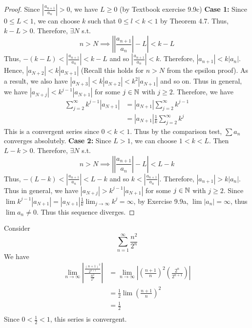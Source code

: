 \documentclass{article}
\begin{document}
\begin{proof}
Since $\left|\frac{a_{n+1}}{a_n}\right| > 0$, we have $L \geq 0$ (by Textbook exercise 9.9c)
\newline
\textbf{Case 1:}\newline
Since $0 \leq L < 1$,  we can choose $k$ such that $0 \leq l < k < 1$ by Theorem 4.7. Thus, $k-L >0$. Therefore, $\exists N$ s.t. \[n > N \implies \left| |\frac{a_{n+1}}{a_n}| - L \right| < k - L\]
Thus, $-(k-L) < \left| \frac{a_{n+1}}{a_n}\right| < k - L $ and so $\left| \frac{a_{n+1}}{a_n}\right| < k$. Therefore, $|a_{n+1}| < k|a_n|$. Hence, $|a_{N+2}| < k|a_{N+1}|$ (Recall this holds for $n > N$ from the epsilon proof). \newline As a result, we also have $|a_{N+3}| < k|a_{N+2}| < k^2|a_{N+1}|$ and so on. Thus in general, we have $|a_{N+j}| < k^{j-1}|a_{N+1}|$ for some $j \in \mathbb{N}$ with $j \geq 2$. Therefore, we have 
\begin{align*}
    \sum_{j=2}^\infty k^{j-1}|a_{N+1}| &= |a_{N+1}| \sum_{j=2}^\infty k^{j-1}\\
    &= |a_{N+1}|\frac{1}{k} \sum_{j=2}^\infty k^j
\end{align*}
This is a convergent series since $0 < k < 1$.
Thus by the comparison test, $\sum a_n$ converges absolutely.
\newline
\textbf{Case 2:}\newline
Since $L > 1$, we can choose $1 < k < L$. Then $L - k > 0$.
Therefore, $\exists N$ s.t. \[n > N \implies \left| |\frac{a_{n+1}}{a_n}| - L \right| < L-k\]
Thus, $-(L-k) < \left| \frac{a_{n+1}}{a_n}\right| < L-k $ and so $k < \left| \frac{a_{n+1}}{a_n}\right|$. Therefore, $|a_{n+1}| > k|a_n|$. Thus in general, we have $|a_{N+j}| > k^{j-1}|a_{N+1}|$ for some $j \in \mathbb{N}$ with $j \geq 2$.
Since $\lim k^{j-1}|a_{N+1}| = |a_{N+1}| \frac{1}{k} \lim_{j\to\infty} k^j = \infty$, by Exercise 9.9a, $\lim |a_n| = \infty$, thus $\lim a_n \not = 0$. Thus this sequence diverges.
\end{proof}
\begin{example}
Consider \[\sum_{n=1}^\infty \frac{n^2}{2^n}\]
We have
\begin{align*}
    \lim_{n\to\infty} \left|\frac{\frac{(n+1)^2}{2^{n+1}}}{\frac{n^2}{2^n}}\right|  &= \lim_{n\to\infty} \left| (\frac{n+1}{n})^2 (\frac{2^n}{2^{n+1}})\right|\\
    &= \frac{1}{2} \lim \left(\frac{n+1}{n}\right)^2\\
    &= \frac{1}{2}\\
\end{align*}
Since $0 < \frac{1}{2} < 1$, this series is convergent.
\end{example}
\end{document}
